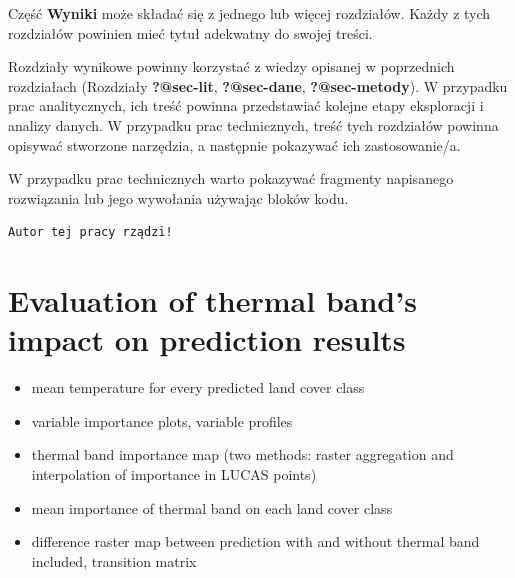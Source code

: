 \documentclass{amuthesis}
\begin{document}
Część \textbf{Wyniki} może składać się z jednego lub więcej rozdziałów.
Każdy z tych rozdziałów powinien mieć tytuł adekwatny do swojej treści.

Rozdziały wynikowe powinny korzystać z wiedzy opisanej w poprzednich
rozdziałach (Rozdziały \textbf{?@sec-lit}, \textbf{?@sec-dane},
\textbf{?@sec-metody}). W przypadku prac analitycznych, ich treść
powinna przedstawiać kolejne etapy eksploracji i analizy danych. W
przypadku prac technicznych, treść tych rozdziałów powinna opisywać
stworzone narzędzia, a następnie pokazywać ich zastosowanie/a.

W przypadku prac technicznych warto pokazywać fragmenty napisanego
rozwiązania lub jego wywołania używając bloków kodu.

\begin{Shaded}
\begin{Highlighting}[]
\OtherTok{=} 
  \NormalTok{)}
\NormalTok{\}}
\NormalTok{(}\NormalTok{)}
\end{Highlighting}
\end{Shaded}

\begin{verbatim}
Autor tej pracy rządzi!
\end{verbatim}


\hypertarget{sec-results-therm}{%
\chapter{Evaluation of thermal band's impact on prediction
results}\label{sec-results-therm}}

\begin{itemize}
\item
  mean temperature for every predicted land cover class
\item
  variable importance plots, variable profiles
\item
  thermal band importance map (two methods: raster aggregation and
  interpolation of importance in LUCAS points)
\item
  mean importance of thermal band on each land cover class
\item
  difference raster map between prediction with and without thermal band
  included, transition matrix
\end{itemize}
\end{document}
